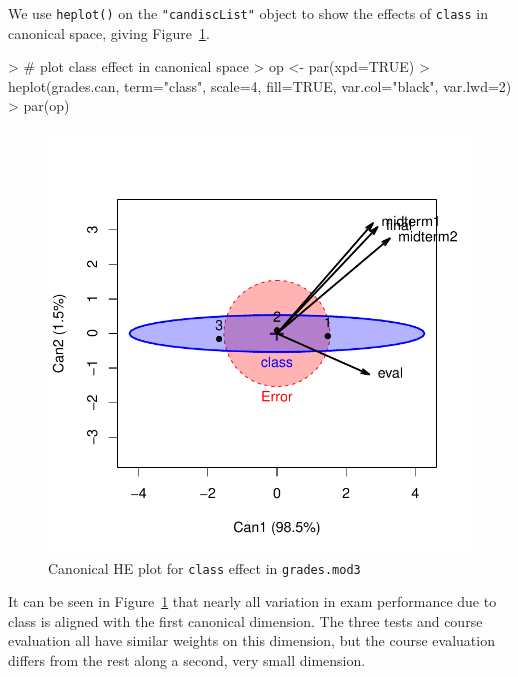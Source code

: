 \documentclass[11pt]{article}
\newcommand{\figref}[1]{Figure~\ref{#1}}
\newcommand{\code}[1]{{\texttt{#1}}}
\newcommand{\func}[1]{{\texttt{#1()}}}
\begin{document}
We use \func{heplot} on the \code{"candiscList"} object to show
the effects of \code{class} in canonical space, giving \figref{fig:grades-can-class}.
\begin{Schunk}
\begin{Sinput}
> # plot class effect in canonical space
>  op <- par(xpd=TRUE)
>  heplot(grades.can, term="class", scale=4, fill=TRUE, var.col="black", var.lwd=2)
>  par(op)
\end{Sinput}
\end{Schunk}
\begin{figure}[htb]
\begin{center}
	\includegraphics[width=.7\textwidth]{fig/plot-grades-can-class}
\caption{Canonical HE plot for \code{class} effect in  \code{grades.mod3}}
\label{fig:grades-can-class}
\end{center}
\end{figure}

It can be seen in \figref{fig:grades-can-class} that nearly all variation
in exam performance due to class is aligned with the first canonical dimension.
The three tests and course evaluation all have similar weights on this dimension,
but the course evaluation differs from the rest along a second, very small
dimension.
\end{document}
